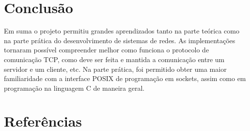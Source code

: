 \documentclass{article}
\begin{document}
\section{Conclusão}

Em suma o projeto permitiu grandes aprendizados tanto na parte teórica como na
parte prática do desenvolvimento de sistemas de redes. As implementações
tornaram
possível compreender melhor como funciona o protocolo de comunicação TCP, como
deve ser feita e mantida a comunicação entre um servidor e um cliente, etc. Na
parte prática, foi permitido obter uma maior familiaridade
com a interface POSIX de programação em sockets, assim como em programação na
linguagem C de maneira geral.

\section{Referências}
\end{document}
